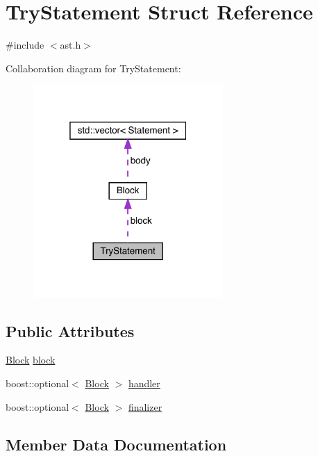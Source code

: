 \hypertarget{struct_try_statement}{}\section{Try\+Statement Struct Reference}
\label{struct_try_statement}


{\ttfamily \#include $<$ast.\+h$>$}



Collaboration diagram for Try\+Statement\+:\nopagebreak
\begin{figure}[H]
\begin{center}
\leavevmode
\includegraphics[width=205pt]{struct_try_statement__coll__graph}
\end{center}
\end{figure}
\subsection*{Public Attributes}
\begin{DoxyCompactItemize}
\item 
\hyperlink{struct_block}{Block} \hyperlink{struct_try_statement_ab2ff67fb1eff24dd249e6fa89fc01702}{block}
\item 
boost\+::optional$<$ \hyperlink{struct_block}{Block} $>$ \hyperlink{struct_try_statement_afa043b0a35a0be28a40799cb4e703a12}{handler}
\item 
boost\+::optional$<$ \hyperlink{struct_block}{Block} $>$ \hyperlink{struct_try_statement_a1260e64a5438f82ea3d4be1fb9174c41}{finalizer}
\end{DoxyCompactItemize}


\subsection{Member Data Documentation}
\mbox{\label{struct_try_statement_ab2ff67fb1eff24dd249e6fa89fc01702}} 
